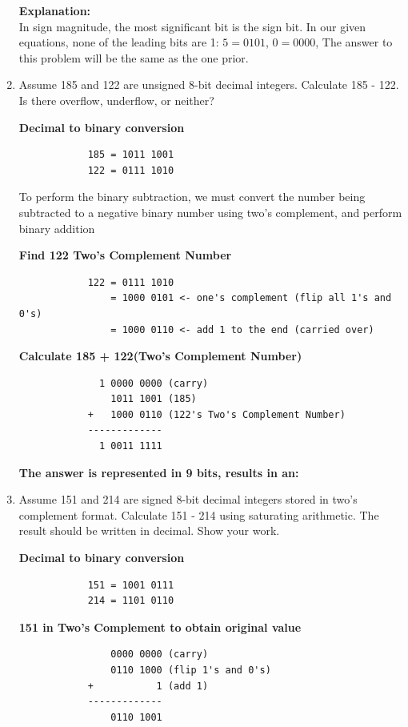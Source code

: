 \documentclass{article}
\begin{document}
\begin{enumerate}
        \textbf{Explanation:}\\
        In sign magnitude, the most significant bit is the sign bit. In our given equations, none of the leading bits are 1: $5 = 0101$, $0 = 0000$, The answer to this problem will be the same as the one prior.

        \item Assume 185 and 122 are unsigned 8-bit decimal integers. Calculate 185 - 122. Is there overflow, underflow, or neither?
        
        \textbf{Decimal to binary conversion}
        \begin{verbatim}
            185 = 1011 1001
            122 = 0111 1010
        \end{verbatim}

        To perform the binary subtraction, we must convert the number being subtracted to a negative binary number using two's complement, and perform binary addition

        \textbf{Find 122 Two's Complement Number}
        \begin{verbatim}
            122 = 0111 1010
                = 1000 0101 <- one's complement (flip all 1's and 0's)
                = 1000 0110 <- add 1 to the end (carried over)
        \end{verbatim}

        \textbf{Calculate 185 + 122(Two's Complement Number)}
        \begin{verbatim}
              1 0000 0000 (carry)
                1011 1001 (185)
            +   1000 0110 (122's Two's Complement Number)
            -------------
              1 0011 1111
        \end{verbatim}

        \textbf{The answer is represented in 9 bits, results in an: }

        \item Assume 151 and 214 are signed 8-bit decimal integers stored in two's complement format. Calculate 151 - 214 using saturating arithmetic. The result should be written in decimal. Show your work.
        
        \textbf{Decimal to binary conversion}
        \begin{verbatim}
            151 = 1001 0111
            214 = 1101 0110
        \end{verbatim}

        \textbf{151 in Two's Complement to obtain original value}
        \begin{verbatim}
                0000 0000 (carry)
                0110 1000 (flip 1's and 0's)
            +           1 (add 1)
            -------------
                0110 1001
        \end{verbatim}


\end{enumerate}
\end{document}
